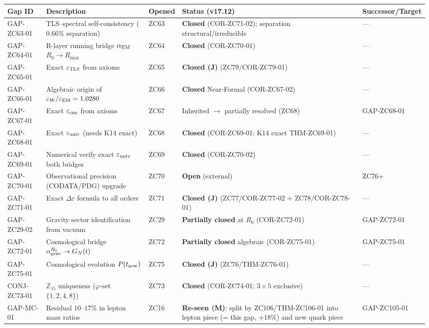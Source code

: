 \documentclass[11pt, a4paper]{article}
\newcommand{\Ztf}{\mathbb{Z}_{15}}
\newcommand{\epscan}{\varepsilon_{\rm can}}
\begin{document}
\smallskip
{\small
\begin{longtable}{p{2.6cm} p{4.6cm} p{1.6cm} p{2.6cm} p{2.4cm}}
\toprule
Gap ID & Description & Opened & Status (v17.12) & Successor/Target \\
\midrule
\endhead
GAP-ZC63-01 & TLS--spectral self-consistency ($0.66\%$ separation) & ZC63 & \textbf{Closed} (COR-ZC71-02); separation structural/irreducible & --- \\
GAP-ZC64-01 & R-layer running bridge $\alpha_{\rm EM}$ $R_0{\to}R_{\max}$ & ZC64 & \textbf{Closed} (COR-ZC70-01) & --- \\
GAP-ZC65-01 & Exact $\varepsilon_{\rm TLS}$ from axioms & ZC65 & \textbf{Closed (J)} (ZC79/COR-ZC79-01) & --- \\
GAP-ZC66-01 & Algebraic origin of $\varepsilon_{\rm W}/\varepsilon_{\rm EM}=1.0280$ & ZC66 & \textbf{Closed} Near-Formal (COR-ZC67-02) & --- \\
GAP-ZC67-01 & Exact $\epscan$ from axioms & ZC67 & Inherited $\to$ partially resolved (ZC68) & GAP-ZC68-01 \\
GAP-ZC68-01 & Exact $\varepsilon_{\rm univ}$ (needs K14 exact) & ZC68 & \textbf{Closed} (COR-ZC69-01; K14 exact THM-ZC69-01) & --- \\
GAP-ZC69-01 & Numerical verify exact $\varepsilon_{\rm univ}$ both bridges & ZC69 & \textbf{Closed} (COR-ZC70-02) & --- \\
GAP-ZC70-01 & Observational precision (CODATA/PDG) upgrade & ZC70 & \textbf{Open} (external) & ZC76+ \\
GAP-ZC71-01 & Exact $\Delta\varepsilon$ formula to all orders & ZC71 & \textbf{Closed (J)} (ZC77/COR-ZC77-02 + ZC78/COR-ZC78-01) & --- \\
GAP-ZC29-02 & Gravity sector identification from vacuum & ZC29 & \textbf{Partially closed} at $R_0$ (COR-ZC72-01) & GAP-ZC72-01 \\
GAP-ZC72-01 & Cosmological bridge $\alpha_{\rm grav}^{R_0}\to G_N(t)$ & ZC72 & \textbf{Partially closed} algebraic (COR-ZC75-01) & GAP-ZC75-01 \\
GAP-ZC75-01 & Cosmological evolution $P(t_{\rm now})$ & ZC75 & \textbf{Closed (J)} (ZC76/THM-ZC76-01) & --- \\
CONJ-ZC73-01 & $\Ztf$ uniqueness ($\varphi$-set $\{1,2,4,8\}$) & ZC73 & \textbf{Closed} (COR-ZC74-01; $3\times5$ exclusive) & --- \\
GAP-MC-01 & Residual $10$--$17\%$ in lepton mass ratios & ZC16 & \textbf{Re-seen (M)}: split by ZC106/THM-ZC106-01 into lepton piece (= this gap, $+18\%$) and new quark piece & GAP-ZC105-01 \\

\end{longtable}}
\end{document}
